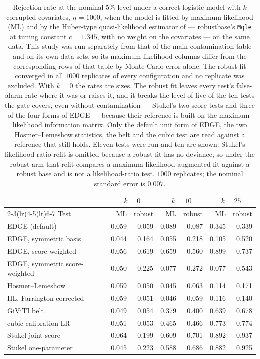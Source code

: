 \begin{table}[htbp]\centering\small
\caption{Rejection rate at the nominal $5\%$ level under a correct logistic model with $k$
corrupted covariates, $n=1000$, when the model is fitted by maximum likelihood (ML) and by the
Huber-type quasi-likelihood estimator of \citet{cantoni2001robust} --- \textsf{robustbase}'s
\texttt{Mqle} at tuning constant $c=1.345$, with no weight on the covariates --- on the same
data. This study was run separately from that of
the main contamination table and on its own data sets, so its maximum-likelihood columns differ
from the corresponding rows of that table by Monte Carlo error alone. The robust fit converged in
all $1000$ replicates of every configuration and no replicate was excluded. With $k=0$ the
rates are sizes. The robust fit leaves every test's false-alarm rate where it was or raises
it, and it breaks the level of five of the ten tests the gate covers, even without contamination
--- Stukel's two score tests and three of the four forms of EDGE --- because their
reference is built on the maximum-likelihood information matrix. Only the default unit form of
EDGE, the two Hosmer--Lemeshow statistics, the belt and the cubic test are read
against a reference that still holds. Eleven tests were run and ten are shown: Stukel's
likelihood-ratio refit is omitted because a robust fit has no deviance, so under the robust arm
that refit compares a maximum-likelihood augmented fit against a robust base and is not a
likelihood-ratio test. $1000$ replicates; the nominal standard error is $0.007$.}
\label{tab:robust}
\begin{tabular}{lrrrrrr}\hline
 & \multicolumn{2}{c}{$k=0$} & \multicolumn{2}{c}{$k=10$} & \multicolumn{2}{c}{$k=25$} \\
\cmidrule(lr){2-3}\cmidrule(lr){4-5}\cmidrule(lr){6-7}
Test & ML & robust & ML & robust & ML & robust \\ \hline
EDGE (default) & 0.059 & 0.059 & 0.089 & 0.087 & 0.345 & 0.339 \\
EDGE, symmetric basis & 0.044 & 0.164 & 0.055 & 0.218 & 0.105 & 0.520 \\
EDGE, score-weighted & 0.056 & 0.619 & 0.659 & 0.560 & 0.899 & 0.737 \\
EDGE, symmetric score-weighted & 0.050 & 0.225 & 0.077 & 0.272 & 0.077 & 0.543 \\
Hosmer--Lemeshow & 0.059 & 0.050 & 0.045 & 0.063 & 0.114 & 0.171 \\
HL, Farrington-corrected & 0.059 & 0.051 & 0.046 & 0.059 & 0.116 & 0.140 \\
GiViTI belt & 0.049 & 0.054 & 0.379 & 0.400 & 0.639 & 0.678 \\
cubic calibration LR & 0.051 & 0.053 & 0.465 & 0.466 & 0.773 & 0.774 \\
Stukel joint score & 0.064 & 0.199 & 0.609 & 0.701 & 0.892 & 0.937 \\
Stukel one-parameter & 0.045 & 0.223 & 0.588 & 0.686 & 0.882 & 0.925 \\
\hline\end{tabular}\end{table}
